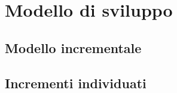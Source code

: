 \section{Modello di sviluppo} \label{modello_di_sviluppo}

\subsection{Modello incrementale} \label{modello_incrementale}

\subsection{Incrementi individuati} \label{incrementi}
